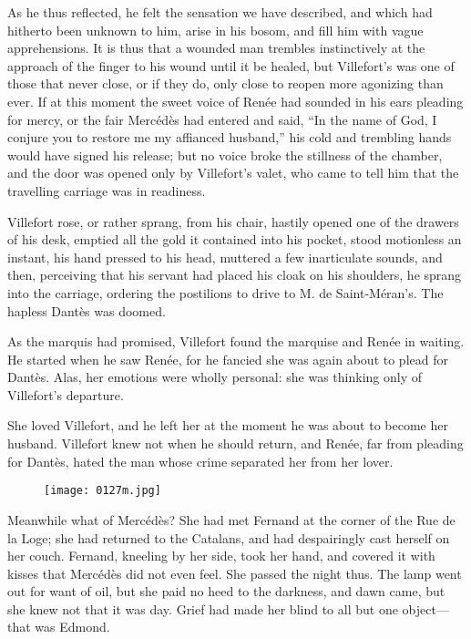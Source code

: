 As he thus reflected, he felt the sensation we have described, and
which had hitherto been unknown to him, arise in his bosom, and fill
him with vague apprehensions. It is thus that a wounded man trembles
instinctively at the approach of the finger to his wound until it be
healed, but Villefort’s was one of those that never close, or if they
do, only close to reopen more agonizing than ever. If at this moment
the sweet voice of Renée had sounded in his ears pleading for mercy, or
the fair Mercédès had entered and said, “In the name of God, I conjure
you to restore me my affianced husband,” his cold and trembling hands
would have signed his release; but no voice broke the stillness of the
chamber, and the door was opened only by Villefort’s valet, who came to
tell him that the travelling carriage was in readiness.

Villefort rose, or rather sprang, from his chair, hastily opened one of
the drawers of his desk, emptied all the gold it contained into his
pocket, stood motionless an instant, his hand pressed to his head,
muttered a few inarticulate sounds, and then, perceiving that his
servant had placed his cloak on his shoulders, he sprang into the
carriage, ordering the postilions to drive to M. de Saint-Méran’s. The
hapless Dantès was doomed.

As the marquis had promised, Villefort found the marquise and Renée in
waiting. He started when he saw Renée, for he fancied she was again
about to plead for Dantès. Alas, her emotions were wholly personal: she
was thinking only of Villefort’s departure.

She loved Villefort, and he left her at the moment he was about to
become her husband. Villefort knew not when he should return, and
Renée, far from pleading for Dantès, hated the man whose crime
separated her from her lover.

\begin{figure}[h]
\texttt{[image: 0127m.jpg]}
\end{figure}

Meanwhile what of Mercédès? She had met Fernand at the corner of the
Rue de la Loge; she had returned to the Catalans, and had despairingly
cast herself on her couch. Fernand, kneeling by her side, took her
hand, and covered it with kisses that Mercédès did not even feel. She
passed the night thus. The lamp went out for want of oil, but she paid
no heed to the darkness, and dawn came, but she knew not that it was
day. Grief had made her blind to all but one object—that was Edmond.

